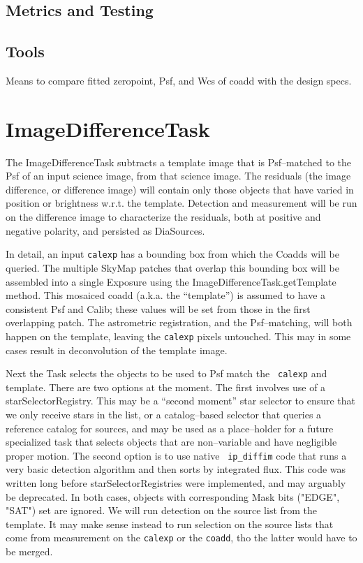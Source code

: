 \documentclass[12pt]{article}
\begin{document}
\subsection{Metrics and Testing}

\subsection{Tools}
Means to compare fitted zeropoint, Psf, and Wcs of coadd with the
design specs.


\clearpage 
\section{ImageDifferenceTask \label{sec-imagedifftask}} 

The ImageDifferenceTask subtracts a template image that is
Psf--matched to the Psf of an input science image, from that science
image.  The residuals (the image difference, or difference image) will
contain only those objects that have varied in position or brightness
w.r.t. the template.  Detection and measurement will be run on the
difference image to characterize the residuals, both at positive and
negative polarity, and persisted as DiaSources.

In detail, an input {\tt calexp} has a bounding box from which the
Coadds will be queried.  The multiple SkyMap patches that overlap this
bounding box will be assembled into a single Exposure using the
ImageDifferenceTask.getTemplate method.  This mosaiced coadd
(a.k.a. the ``template'') is assumed to have a consistent Psf and
Calib; these values will be set from those in the first overlapping
patch.  The astrometric registration, and the Psf--matching, will both
happen on the template, leaving the {\tt calexp} pixels untouched.
This may in some cases result in deconvolution of the template image.

Next the Task selects the objects to be used to Psf match the {\tt
  calexp} and template.  There are two options at the moment.  The
first involves use of a starSelectorRegistry.  This may be a ``second
moment'' star selector to ensure that we only receive stars in the
list, or a catalog--based selector that queries a reference catalog
for sources, and may be used as a place--holder for a future
specialized task that selects objects that are non--variable and have
negligible proper motion.  The second option is to use native {\tt
  ip\_diffim} code that runs a very basic detection algorithm and then
sorts by integrated flux.  This code was written long before
starSelectorRegistries were implemented, and may arguably be
deprecated.  In both cases, objects with corresponding Mask bits
("EDGE", "SAT") set are ignored.  We will run detection on the source
list from the template.  It may make sense instead to run selection on
the source lists that come from measurement on the {\tt calexp} or the
{\tt coadd}, tho the latter would have to be merged.
\end{document}
